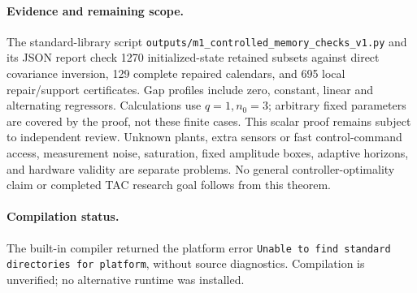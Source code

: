 \documentclass[11pt]{article}
\begin{document}
\paragraph{Evidence and remaining scope.}
The standard-library script
\texttt{outputs/m1\_controlled\_memory\_checks\_v1.py} and its JSON report
check 1270 initialized-state retained subsets against direct covariance
inversion, 129 complete repaired calendars, and 695 local repair/support
certificates. Gap profiles include zero, constant, linear and alternating
regressors. Calculations use $q=1,n_0=3$; arbitrary fixed parameters are
covered by the proof, not these finite cases.
This scalar proof remains subject to independent review.
Unknown plants, extra sensors or fast control-command access, measurement
noise, saturation, fixed amplitude boxes, adaptive horizons, and hardware
validity are separate problems. No general controller-optimality claim
or completed TAC research goal follows from this theorem.
\paragraph{Compilation status.}
The built-in compiler returned the platform error
\texttt{Unable to find standard directories for platform}, without source
diagnostics. Compilation is unverified; no alternative runtime was installed.
\end{document}
